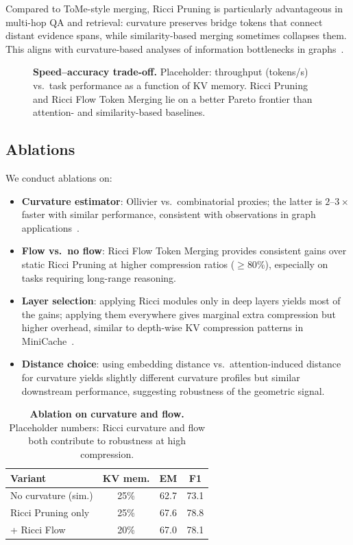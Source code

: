 \documentclass{article}
\theoremstyle{plain}
\theoremstyle{definition}
\theoremstyle{remark}
\begin{document}
Compared to ToMe-style merging, Ricci Pruning is particularly advantageous in multi-hop QA and retrieval: curvature preserves bridge tokens that connect distant evidence spans, while similarity-based merging sometimes collapses them. This aligns with curvature-based analyses of information bottlenecks in graphs~\citep{tian2025curvatureclustering,yadav2025roadmap}.

\begin{figure}[t]
  \centering
  \fbox{\rule{0pt}{1.25in}\rule{0.95\columnwidth}{0pt}}
  \caption{\textbf{Speed--accuracy trade-off.} Placeholder: throughput (tokens/s) vs.\ task performance as a function of KV memory. Ricci Pruning and Ricci Flow Token Merging lie on a better Pareto frontier than attention- and similarity-based baselines.}
  \label{fig:pareto}
\end{figure}

\subsection{Ablations}

We conduct ablations on:
\begin{itemize}
  \item \textbf{Curvature estimator}: Ollivier vs.\ combinatorial proxies; the latter is $2$--$3\times$ faster with similar performance, consistent with observations in graph applications~\citep{ni2019community,weber2024discrete}.
  \item \textbf{Flow vs.\ no flow}: Ricci Flow Token Merging provides consistent gains over static Ricci Pruning at higher compression ratios ($\geq80\%$), especially on tasks requiring long-range reasoning.
  \item \textbf{Layer selection}: applying Ricci modules only in deep layers yields most of the gains; applying them everywhere gives marginal extra compression but higher overhead, similar to depth-wise KV compression patterns in MiniCache~\citep{liu2024minicache}.
  \item \textbf{Distance choice}: using embedding distance vs.\ attention-induced distance for curvature yields slightly different curvature profiles but similar downstream performance, suggesting robustness of the geometric signal.
\end{itemize}

\begin{table}[t]
  \centering
  \caption{\textbf{Ablation on curvature and flow.} Placeholder numbers: Ricci curvature and flow both contribute to robustness at high compression.}
  \label{tab:ablation}
  \begin{tabular}{lccc}
    \toprule
    Variant & KV mem. & EM & F1 \\
    \midrule
    No curvature (sim.) & 25\% & 62.7 & 73.1 \\
    Ricci Pruning only  & 25\% & 67.6 & 78.8 \\
    + Ricci Flow        & 20\% & 67.0 & 78.1 \\
    \bottomrule
  \end{tabular}
\end{table}
\end{document}
